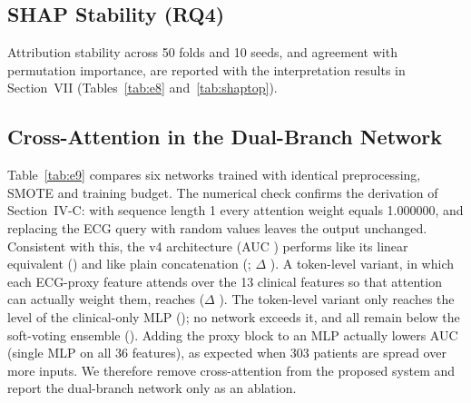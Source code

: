 \subsection{SHAP Stability (RQ4)}
Attribution stability across 50 folds and 10 seeds, and agreement with permutation importance, are reported with the interpretation results in Section~VII (Tables~\ref{tab:e8} and~\ref{tab:shaptop}).

\subsection{Cross-Attention in the Dual-Branch Network}
Table~\ref{tab:e9} compares six networks trained with identical preprocessing, SMOTE and training budget. The numerical check confirms the derivation of Section~IV-C: with sequence length 1 every attention weight equals 1.000000, and replacing the ECG query with random values leaves the output unchanged. Consistent with this, the v4 architecture (AUC \xattnAUC{}) performs like its linear equivalent (\linearAUC{}) and like plain concatenation (\concatAUC{}; $\Delta$ \dConcat{}). A token-level variant, in which each ECG-proxy feature attends over the 13 clinical features so that attention can actually weight them, reaches \tokensAUC{} ($\Delta$ \dTokens{}). The token-level variant only reaches the level of the clinical-only MLP (\mlpClinAUC{}); no network exceeds it, and all remain below the soft-voting ensemble (\fullAUC{}). Adding the proxy block to an MLP actually lowers AUC (single MLP on all 36 features), as expected when 303 patients are spread over more inputs. We therefore remove cross-attention from the proposed system and report the dual-branch network only as an ablation.



